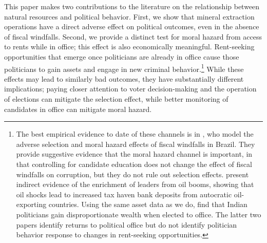 \documentclass[12pt,letterpaper]{article}
\begin{document}
This paper makes two contributions to the literature on the
relationship between natural resources and political behavior. First,
we show that mineral extraction operations have a direct adverse
effect on political outcomes, even in the absence of fiscal windfalls.
Second, we provide a distinct test for moral hazard from access to
rents while in office; this effect is also economically
meaningful. Rent-seeking opportunities that emerge once politicians
are already in office cause those politicians to gain assets and
engage in new criminal behavior.\footnote{The best empirical evidence
  to date of these channels is in , who model
  the adverse selection and moral hazard effects of fiscal windfalls
  in Brazil. They provide suggestive evidence that the moral hazard
  channel is important, in that controlling for candidate education
  does not change the effect of fiscal windfalls on corruption, but
  they do not rule out selection effects. 
  present indirect evidence of the enrichment of leaders from oil
  booms, showing that oil shocks lead to increased tax haven bank
  deposits from autocratic oil-exporting countries. Using the same
  asset data as we do,  find that Indian
  politicians gain disproportionate wealth when elected to office. The
  latter two papers identify returns to political office but do not
  identify politician behavior response to changes in rent-seeking
  opportunities.} While these effects may lead to similarly bad
outcomes, they have substantially different implications; paying
closer attention to voter decision-making and the operation of
elections can mitigate the selection effect, while better monitoring
of candidates in office can mitigate moral hazard.
\end{document}
